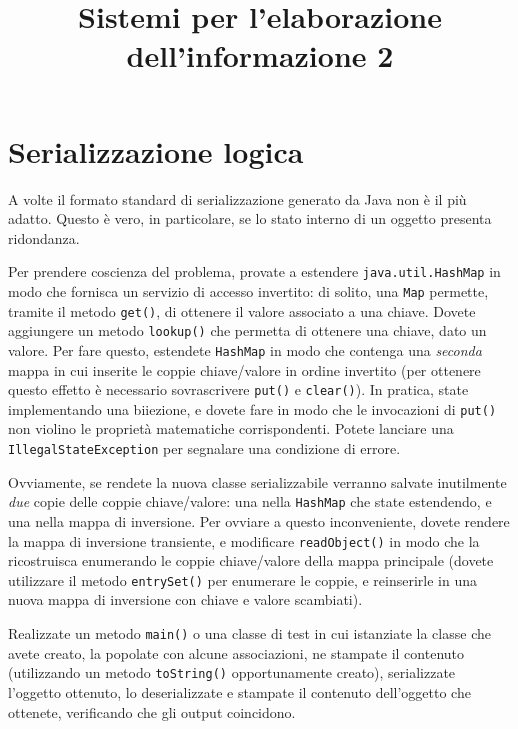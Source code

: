 \documentclass{article}
\title{Sistemi per l'elaborazione dell'informazione 2}
\date{}
\begin{document}

\maketitle

\section*{Serializzazione logica}

A volte il formato standard di serializzazione generato da Java non \`e il pi\`u adatto. Questo \`e vero, in particolare, se lo stato interno di un oggetto presenta ridondanza.

Per prendere coscienza del problema, provate a estendere \texttt{java.util.HashMap} in modo che fornisca un servizio di accesso invertito: di solito, una \texttt{Map} permette, tramite il metodo \texttt{get()}, di ottenere il valore associato a una chiave. Dovete aggiungere un metodo \texttt{lookup()} che permetta di ottenere una chiave, dato un valore. Per fare questo, estendete \texttt{HashMap} in modo che contenga una \emph{seconda} mappa in cui inserite le coppie chiave/valore in ordine invertito (per ottenere questo effetto \`e necessario sovrascrivere \texttt{put()} e \texttt{clear()}). In pratica, state implementando una biiezione, e dovete fare in modo che le invocazioni di \texttt{put()} non violino le propriet\`a matematiche corrispondenti. Potete lanciare una \texttt{IllegalStateException} per segnalare una condizione di errore.

Ovviamente, se rendete la nuova classe serializzabile verranno salvate inutilmente \emph{due} copie delle coppie chiave/valore: una nella \texttt{HashMap} che state estendendo, e una nella mappa di inversione. Per ovviare a questo inconveniente, dovete rendere la mappa di inversione transiente, e modificare \texttt{readObject()} in modo che la ricostruisca enumerando le coppie chiave/valore della mappa principale (dovete utilizzare il metodo \texttt{entrySet()} per enumerare le coppie, e reinserirle in una nuova mappa di inversione con chiave e valore scambiati).

Realizzate un metodo \texttt{main()} o una classe di test in cui istanziate la classe che avete creato, la popolate con alcune associazioni, ne stampate il contenuto (utilizzando un metodo \texttt{toString()} opportunamente creato), serializzate l'oggetto ottenuto, lo deserializzate e stampate il contenuto dell'oggetto che ottenete, verificando che gli output coincidono.
\end{document}
